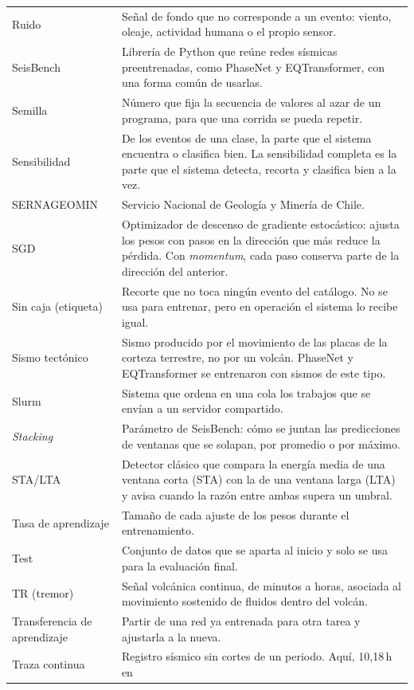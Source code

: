 {\begin{longtable}{>{\raggedright\arraybackslash}p{3.4cm}>{\raggedright\arraybackslash}p{9.4cm}}
Ruido & Señal de fondo que no corresponde a un evento: viento, oleaje,
actividad humana o el propio sensor. \\
SeisBench & Librería de Python que reúne redes sísmicas preentrenadas, como
PhaseNet y EQTransformer, con una forma común de usarlas. \\
Semilla & Número que fija la secuencia de valores al azar de un programa, para
que una corrida se pueda repetir. \\
Sensibilidad & De los eventos de una clase, la parte que el sistema encuentra o
clasifica bien. La sensibilidad completa es la parte que el sistema detecta,
recorta y clasifica bien a la vez. \\
SERNAGEOMIN & Servicio Nacional de Geología y Minería de Chile. \\
SGD & Optimizador de descenso de gradiente estocástico: ajusta los pesos con
pasos en la dirección que más reduce la pérdida. Con \emph{momentum}, cada paso
conserva parte de la dirección del anterior. \\
Sin caja (etiqueta) & Recorte que no toca ningún evento del catálogo. No se usa
para entrenar, pero en operación el sistema lo recibe igual. \\
Sismo tectónico & Sismo producido por el movimiento de las placas de la corteza
terrestre, no por un volcán. PhaseNet y EQTransformer se entrenaron con
sismos de este tipo. \\
Slurm & Sistema que ordena en una cola los trabajos que se envían a un servidor
compartido. \\
\emph{Stacking} & Parámetro de SeisBench: cómo se juntan las predicciones de
ventanas que se solapan, por promedio o por máximo. \\
STA/LTA & Detector clásico que compara la energía media de una ventana corta
(STA) con la de una ventana larga (LTA) y avisa cuando la razón entre ambas
supera un umbral. \\
Tasa de aprendizaje & Tamaño de cada ajuste de los pesos durante el
entrenamiento. \\
Test & Conjunto de datos que se aparta al inicio y solo se usa para la
evaluación final. \\
TR (tremor) & Señal volcánica continua, de minutos a horas, asociada al
movimiento sostenido de fluidos dentro del volcán. \\
Transferencia de aprendizaje & Partir de una red ya entrenada para otra tarea
y ajustarla a la nueva. \\
Traza continua & Registro sísmico sin cortes de un periodo. Aquí, 10,18\,h en

\end{longtable}}

